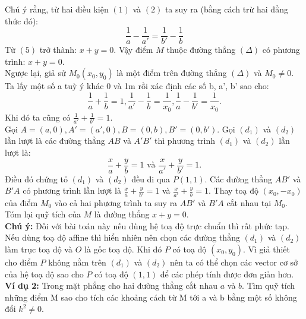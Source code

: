 \documentclass[12pt,a4]{article}
\begin{document}
\begin{titlepage}
\[\]
Chú ý rằng, từ hai điều kiện $(1)$ và $(2)$ ta suy ra (bằng cách trừ hai đẳng thức đó):
\[
\frac{1}{a} - \frac{1}{a'} = \frac{1}{b'} - \frac{1}{b}
\]
Từ $(5)$ trở thành: $x + y = 0.$ Vậy điểm $M$ thuộc đường thẳng $(\Delta)$ có phương trình: $x + y = 0.$\\
Ngược lại, giả sử $M_0(x_0,y_0)$ là một điểm trên đường thẳng $(\Delta)$ và $M_0 \neq 0.$ Ta lấy một số a tuỳ ý khác 0 và 1m rồi xác định các số b, a', b' sao cho:
\[
\frac{1}{a} + \frac{1}{b} = 1, \frac{1}{a'} - \frac{1}{b} = \frac{1}{x_0}, \frac{1}{a} - \frac{1}{b'} = \frac{1}{x_0}.
\]
Khi đó ta cũng có $\frac{1}{a'} + \frac{1}{b'} = 1.$\\
Gọi $A = (a,0), A' = (a',0), B = (0,b), B' = (0,b').$ Gọi $(d_1)$ và $(d_2)$ lần lượt là các đường thẳng $AB$ và $A'B'$ thì phương trình $(d_1)$ và $(d_2)$ lần lượt là:
\[
\frac{x}{a} + \frac{y}{b} = 1 \text{ và } \frac{x}{a'} + \frac{y}{b'} = 1.
\]
Điều đó chứng tỏ $(d_1)$ và $(d_2)$ đều đi qua $P(1,1)$. Các đường thẳng $AB'$ và $B'A$ có phương trình lần lượt là $\frac{x}{a} + \frac{y}{b'} = 1$ và $\frac{x}{a'} + \frac{y}{b} = 1.$ Thay toạ độ $(x_0,-x_0)$ của điểm $M_0$ vào cả hai phương trình ta suy ra $AB'$ và $B'A$ cắt nhau tại $M_0$. Tóm lại quỹ tích của $M$ là đường thẳng $x + y = 0.$\\
\textbf{Chú ý:} Đối với bài toán này nếu dùng hệ toạ độ trực chuẩn thì rất phức tạp. Nếu dùng toạ độ affine thì hiển nhiên nên chọn các đường thẳng $(d_1)$ và $(d_2)$ làm trục toạ độ và $O$ là gốc toạ độ. Khi đó $P$ có toạ độ $(x_0,y_0)$. Vì giả thiết cho điểm $P$ không nằm trên $(d_1)$ và $(d_2)$ nên ta có thể chọn các vector cơ sở của hệ toạ độ sao cho $P$ có toạ độ $(1,1)$ để các phép tính được đơn giản hơn.\\
\vspace{0.2cm}
\textbf{Ví dụ 2:} Trong mặt phẳng cho hai đường thẳng cắt nhau $a$ và $b$. Tìm quỹ tích những điểm M sao cho tích các khoảng cách từ M tới a và b bằng một số không đổi $k^2 \neq 0.$\\
\begin{center}
\end{center}
\end{titlepage}
\end{document}
